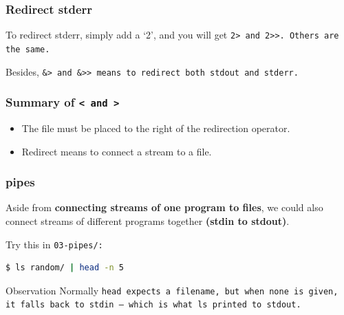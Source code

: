 \begin{frame}[fragile]
\frametitle{Redirect stderr}
\begin{block}{}
To redirect stderr, simply add a `2', and you will get \tt{2>} and \tt{2>>}. Others are the same. 
\end{block}
\begin{block}{}
Besides, \tt{\&>} and \tt{\&>>} means to redirect both stdout and stderr. 
\end{block}
\end{frame}

\begin{frame}[fragile]
\frametitle{Summary of \tt{<} and \tt{>}}
\begin{itemize}
    \item The file must be placed to the right of the redirection operator.
    \item Redirect means to connect a stream to a file. 
\end{itemize}
\end{frame}

\begin{frame}[fragile]
\frametitle{pipes}
Aside from \textbf{connecting streams of one program to files}, we could also connect streams of different programs together \textbf{(stdin to stdout)}.
\vspace{0.5em}

Try this in \tt{03-pipes/}:
\begin{lstlisting}[language=bash]
$ ls random/ | head -n 5
\end{lstlisting}
\begin{figure}
    \centering
\end{figure}
\pause
\begin{block}{Observation}
    Normally \tt{head} expects a filename, but when none is given, it
    falls back to stdin — which is what \tt{ls} printed to stdout.
\end{block}

\end{frame}

